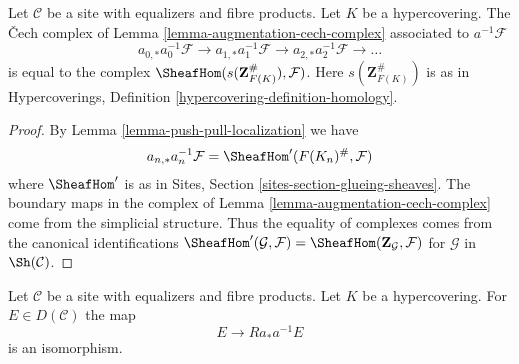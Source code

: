 \begin{lemma}
\label{lemma-hypercovering-cech-complex}
Let $\mathcal{C}$ be a site with equalizers and fibre products.
Let $K$ be a hypercovering. The {\v C}ech complex
of Lemma \ref{lemma-augmentation-cech-complex} associated to
$a^{-1}\mathcal{F}$
$$
a_{0, *}a_0^{-1}\mathcal{F} \to a_{1, *}a_1^{-1}\mathcal{F} \to
a_{2, *}a_2^{-1}\mathcal{F} \to \ldots
$$
is equal to the complex $\SheafHom(s(\mathbf{Z}_{F(K)}^\#), \mathcal{F})$.
Here $s(\mathbf{Z}_{F(K)}^\#)$ is as in
Hypercoverings, Definition \ref{hypercovering-definition-homology}.
\end{lemma}

\begin{proof}
By Lemma \ref{lemma-push-pull-localization} we have
$$
a_{n, *}a_n^{-1}\mathcal{F} = \SheafHom'(F(K_n)^\#, \mathcal{F})
$$
where $\SheafHom'$ is as in Sites, Section \ref{sites-section-glueing-sheaves}.
The boundary maps in the complex of
Lemma \ref{lemma-augmentation-cech-complex}
come from the simplicial structure.
Thus the equality of complexes comes 
from the canonical identifications
$\SheafHom'(\mathcal{G}, \mathcal{F}) =
\SheafHom(\mathbf{Z}_\mathcal{G}, \mathcal{F})$ for
$\mathcal{G}$ in $\Sh(\mathcal{C})$.
\end{proof}

\begin{lemma}
\label{lemma-hypercovering-descent-bounded-abelian}
Let $\mathcal{C}$ be a site with equalizers and fibre products.
Let $K$ be a hypercovering. For
$E \in D(\mathcal{C})$ the map
$$
E \longrightarrow Ra_*a^{-1}E
$$
is an isomorphism.
\end{lemma}

